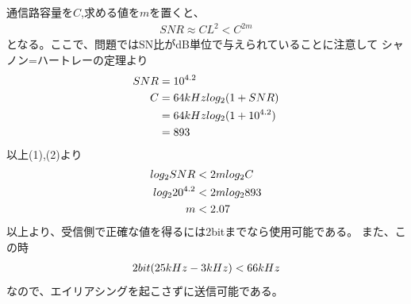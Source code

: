 \documentclass[dvipdfmx]{jsarticle}
\begin{document}
    \section{}
    通信路容量を$C$,求める値を$m$を置くと、
    \begin{align}
        SNR \approx CL^{2} < C^{2m}
    \end{align}
    となる。ここで、問題ではSN比がdB単位で与えられていることに注意して
    シャノン=ハートレーの定理より
    \begin{align}
        SNR &= 10^{4.2} \notag \\
        C &= 64kHz log_2 (1+SNR) \notag \\
          &= 64kHz log_2 (1 + 10^{4.2}) \notag \\
          &= 893
    \end{align}
    以上(1),(2)より
    \begin{align}
        log_2SNR &< 2m log_2C \notag \notag \\
        log_220^{4.2} &< 2mlog_2893 \notag \\
        m &< 2.07 \notag
    \end{align}
    以上より、受信側で正確な値を得るには2bitまでなら使用可能である。
    また、この時
    \begin{align}
        2bit (25kHz - 3kHz) < 66kHz \notag
    \end{align}
    なので、エイリアシングを起こさずに送信可能である。
\end{document}
